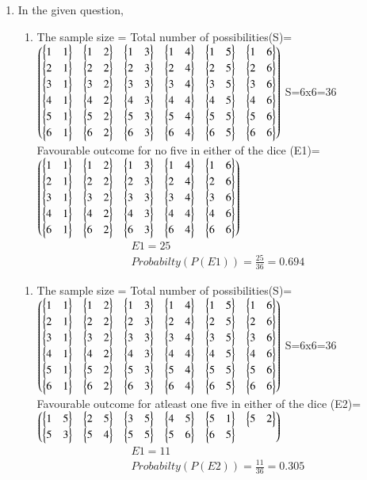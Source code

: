 \renewcommand{\theequation}{\theenumi}
\begin{enumerate}[label=\arabic*.,ref=\thesubsubsection.\theenumi]

\item In the given question,
\\
\begin{enumerate}
\item
\label{eq:1}
The sample size = Total number of possibilities(S)=
$\myvec{\bmat{1&1}&\bmat{1&2}&\bmat{1&3}&\bmat{1&4}&\bmat{1&5}&\bmat{1&6}\\
\bmat{2&1}&\bmat{2&2}&\bmat{2&3}&\bmat{2&4}&\bmat{2&5}&\bmat{2&6}
\\\bmat{3&1}&\bmat{3&2}&\bmat{3&3}&\bmat{3&4}&\bmat{3&5}&\bmat{3&6}
\\\bmat{4&1}&\bmat{4&2}&\bmat{4&3}&\bmat{4&4}&\bmat{4&5}&\bmat{4&6}
\\\bmat{5&1}&\bmat{5&2}&\bmat{5&3}&\bmat{5&4}&\bmat{5&5}&\bmat{5&6}
\\\bmat{6&1}&\bmat{6&2}&\bmat{6&3}&\bmat{6&4}&\bmat{6&5}&\bmat{6&6}}$
S=6x6=36
\\
Favourable outcome for no five in either of the dice (E1)=
$\myvec{\bmat{1&1}&\bmat{1&2}&\bmat{1&3}&\bmat{1&4}&\bmat{1&6}
\\\bmat{2&1}&\bmat{2&2}&\bmat{2&3}&\bmat{2&4}&\bmat{2&6}
\\\bmat{3&1}&\bmat{3&2}&\bmat{3&3}&\bmat{3&4}&\bmat{3&6}
\\\bmat{4&1}&\bmat{4&2}&\bmat{4&3}&\bmat{4&4}&\bmat{4&6}
\\\bmat{6&1}&\bmat{6&2}&\bmat{6&3}&\bmat{6&4}&\bmat{6&6}}$
\begin{align}
E1=25
\\
Probabilty(P(E1))=\frac{25}{36}=0.694
\end{align}
\end{enumerate}
\begin{enumerate}
\item
\label{eq:2}
The sample size = Total number of possibilities(S)=
$\myvec{\bmat{1&1}&\bmat{1&2}&\bmat{1&3}&\bmat{1&4}&\bmat{1&5}&\bmat{1&6}\\
\bmat{2&1}&\bmat{2&2}&\bmat{2&3}&\bmat{2&4}&\bmat{2&5}&\bmat{2&6}
\\\bmat{3&1}&\bmat{3&2}&\bmat{3&3}&\bmat{3&4}&\bmat{3&5}&\bmat{3&6}
\\\bmat{4&1}&\bmat{4&2}&\bmat{4&3}&\bmat{4&4}&\bmat{4&5}&\bmat{4&6}
\\\bmat{5&1}&\bmat{5&2}&\bmat{5&3}&\bmat{5&4}&\bmat{5&5}&\bmat{5&6}
\\\bmat{6&1}&\bmat{6&2}&\bmat{6&3}&\bmat{6&4}&\bmat{6&5}&\bmat{6&6}}$
S=6x6=36
\\
Favourable outcome for atleast one five in either of the dice (E2)=
$\myvec{\bmat{1&5}&\bmat{2&5}&\bmat{3&5}&\bmat{4&5}&\bmat{5&1}&\bmat{5&2}\\\bmat{5&3}&\bmat{5&4}&\bmat{5&5}&\bmat{5&6}&\bmat{6&5}}$
\begin{align}
E1=11
\\
Probabilty(P(E2))=\frac{11}{36}=0.305
\end{align}


\end{enumerate}
\end{enumerate}
